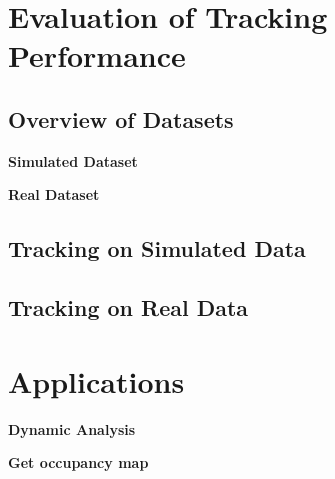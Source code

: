 \section{Evaluation of Tracking Performance}

\subsection{Overview of Datasets}

\textbf{Simulated Dataset}

\textbf{Real Dataset}

\subsection{Tracking on Simulated Data}

\subsection{Tracking on Real Data}

\section{Applications}

\textbf{Dynamic Analysis}

\textbf{Get occupancy map}


 